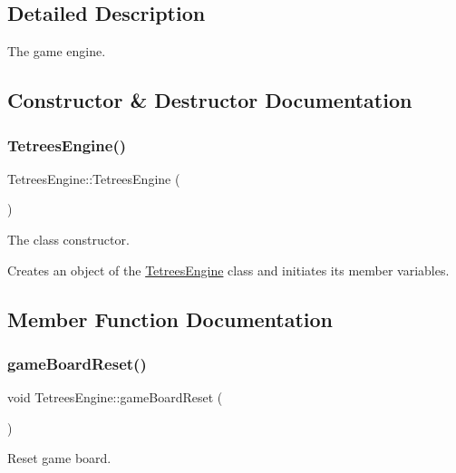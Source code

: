 \subsection{Detailed Description}
The game engine. 

\subsection{Constructor \& Destructor Documentation}
\mbox{\label{classTetreesEngine_ada1775237223604c895a50625eda1d49}} 
\subsubsection{\texorpdfstring{Tetrees\+Engine()}{TetreesEngine()}}
{\footnotesize\ttfamily Tetrees\+Engine\+::\+Tetrees\+Engine (\begin{DoxyParamCaption}{ }\end{DoxyParamCaption})}



The class constructor. 

Creates an object of the \mbox{\hyperlink{classTetreesEngine}{Tetrees\+Engine}} class and initiates its member variables. 

\subsection{Member Function Documentation}
\mbox{\label{classTetreesEngine_ad28ed83be446f74c87d55d79cc64e6ef}} 
\subsubsection{\texorpdfstring{game\+Board\+Reset()}{gameBoardReset()}}
{\footnotesize\ttfamily void Tetrees\+Engine\+::game\+Board\+Reset (\begin{DoxyParamCaption}{ }\end{DoxyParamCaption})\hspace{0.3cm}{\ttfamily [private]}}



Reset game board. 

